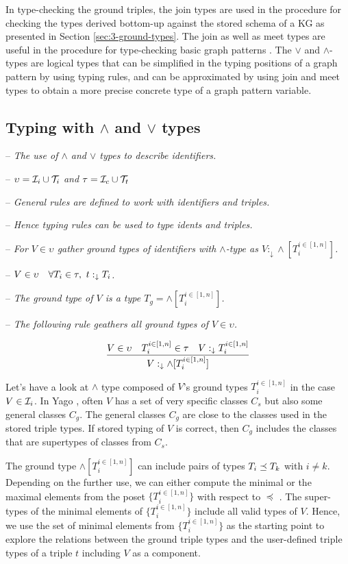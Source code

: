 \documentclass[runningheads]{llncs}
\newcommand{\darr}{\downarrow}
\newcommand{\I}{{\cal I}}
\newcommand{\T}{{\cal T}}
\newcommand{\notes}[1]{\noindent\begin{small}-- \emph{#1}\hfill\break\end{small}}
\newcommand{\nnotes}[1]{\indent\begin{small}-- \emph{#1}\hfill\break\end{small}}
\newcommand{\ennotes}[1]{\indent\begin{small}-- \emph{#1}\hfill\end{small}}
\begin{document}
In type-checking the ground triples, the join types are used in the
procedure for checking the types derived bottom-up against the stored
schema of a KG as presented in Section \ref{sec:3-ground-types}. The
join as well as meet types are useful in the procedure for
type-checking basic graph patterns \cite{Savnik2025a}. The $\lor$ and
$\land$-types are logical types that can be simplified in the typing
positions of a graph pattern by using typing rules, and can be
approximated by using join and meet types to obtain a more precise
concrete type of a graph pattern variable.




\subsection{Typing with $\land$ and $\lor$ types}

\medskip
\notes{The use of $\land$ and $\lor$ types to describe identifiers.}
\nnotes{$\upsilon=\I_i\cup\T_i$ and $\tau=\I_c\cup\T_t$}
\nnotes{General rules are defined to work with identifiers and triples.}
\nnotes{Hence typing rules can be used to type idents and triples.}

\notes{For $V\in\upsilon$ gather ground types of identifiers with $\land$-type as $V:_{\darr}\land[T_i^{i\in[1,n]}]$.}
\nnotes{$V\in\upsilon\quad\forall\/T_i\in\tau,\ t:_{\darr}T_i$.}
\nnotes{The ground type of $V$ is a type $T_g=\land[T_i^{i\in[1,n]}]$.}
\ennotes{The following rule geathers all ground types of $V\in\upsilon$.}

\begin{equation}
\label{rul:land-1}
\dfrac{V\in\upsilon\quad\/T_i^{i\in[1,n]}\in\tau\quad\/V:_{\darr}T_i^{i\in[1,n]}}
      {V:_{\darr}\land[T_i^{i\in[1,n]}]}
\end{equation}

Let's have a look at $\land$ type composed of $V$'s ground types
$T_i^{i\in[1,n]}$ in the case $V\in\I_i$. In Yago \cite{Hoffart2013},
often $V$ has a set of very specific classes $C_s$ but also some
general classes $C_g$. The general classes $C_g$ are close to the
classes used in the stored triple types. If stored typing of $V$ is
correct, then $C_g$ includes the classes that are supertypes of
classes from $C_s$.

The ground type $\land[T_i^{i\in[1,n]}]$ can include pairs of types
$T_i\preceq\/T_k$ with $i\not=k$. Depending on the further use, we can
either compute the minimal or the maximal elements from the poset
$\{T_i^{i\in[1,n]}\}$ with respect to $\preceq$
\cite{DaveyPriestley2002}. The super-types of the minimal elements of
$\{T_i^{i\in[1,n]}\}$ include all valid types of $V$. Hence, we use
the set of minimal elements from $\{T_i^{i\in[1,n]}\}$ as the starting
point to explore the relations between the ground triple types and the
user-defined triple types of a triple $t$ including $V$ as a
component.
\end{document}
